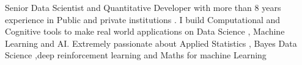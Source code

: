 

\begin{cvparagraph}

Senior Data Scientist and Quantitative Developer with more than 8 years experience in Public and private institutions . I build Computational and Cognitive tools to make real world applications on Data Science , Machine Learning and AI. Extremely passionate about Applied Statistics , Bayes Data Science ,deep reinforcement learning and Maths for machine Learning
\end{cvparagraph}
